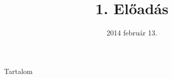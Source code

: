 \documentclass[aspectratio=169]{beamer}
\title[]{1. Előadás}
\date{2014 február 13.}
\begin{document}
\begin{frame}
\titlepage
\end{frame}

\begin{frame}{Tartalom}
\tableofcontents
\end{frame}




\end{document}
